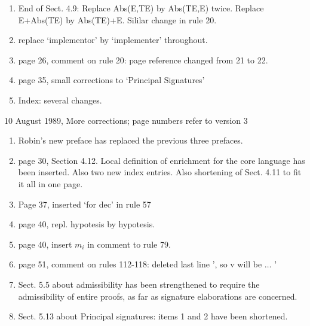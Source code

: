 \begin{description}
\begin{enumerate}
\item End of Sect. 4.9: Replace Abs(E,TE) by Abs(TE,E) twice. Replace E+Abs(TE)
by Abs(TE)+E. Sililar change in rule 20.
\item replace `implementor' by `implementer' throughout.
\item page 26, comment on rule 20:  page reference changed from 21 to 22.
\item page 35, small corrections to `Principal Signatures'
\item Index: several changes.
\end{enumerate}
\item{10 August 1989, More corrections; page numbers refer to version 3}
\begin{enumerate}
\item Robin's new preface has replaced the previous three prefaces.
\item page 30, Section 4.12. Local definition of enrichment for
the core language has been inserted. Also two new index entries.
Also shortening of Sect. 4.11 to fit it all in one page.
\item Page 37, inserted `for dec' in rule 57
\item page 40, repl. hypotesis by hypotesis.
\item page 40, insert $m_i$ in comment to rule 79.
\item page 51, comment on rules 112-118: deleted last line ', so v will be
$\ldots$  '
\item Sect. 5.5 about admissibility has been strengthened to require
the admissibility of entire proofs, as far as signature elaborations
are concerned.
\item Sect. 5.13 about Principal signatures: items 1 and 2 have
been shortened.
\end{enumerate}
\end{description}

